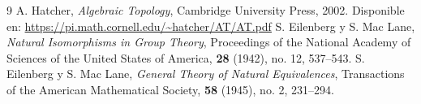 \renewcommand{\refname}{Referencias\\}
\begin{thebibliography}{9}
    A. Hatcher, \emph{Algebraic Topology}, Cambridge University Press, 2002.
    Disponible en: \url{https://pi.math.cornell.edu/~hatcher/AT/AT.pdf}
S. Eilenberg y S. Mac Lane,
\textit{Natural Isomorphisms in Group Theory},
Proceedings of the National Academy of Sciences of the United States of America,
\textbf{28} (1942), no. 12, 537--543.
S. Eilenberg y S. Mac Lane,
\textit{General Theory of Natural Equivalences},
Transactions of the American Mathematical Society,
\textbf{58} (1945), no. 2, 231--294.
\end{thebibliography}